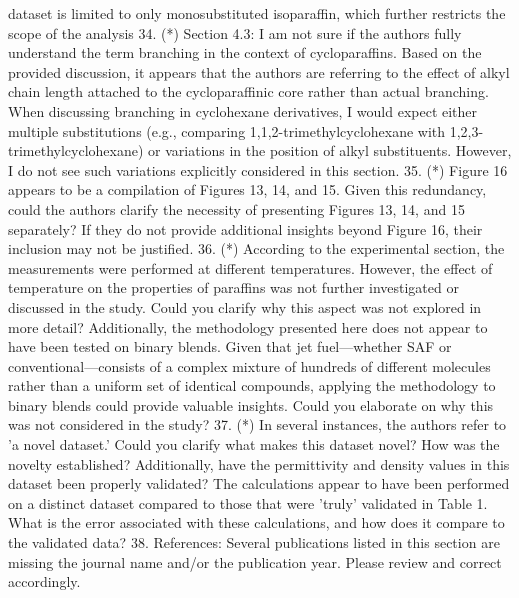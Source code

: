 \documentclass{article}
\begin{document}
dataset is limited to only monosubstituted isoparaffin, which further restricts the scope of the analysis
34.     (*) Section 4.3: I am not sure if the authors fully understand the term branching in the context of cycloparaffins. Based on the provided discussion, it appears that the authors are referring to the effect of alkyl chain length attached to the cycloparaffinic core rather than actual branching. When discussing branching in cyclohexane derivatives, I would expect either multiple substitutions (e.g., comparing 1,1,2-trimethylcyclohexane with 1,2,3-trimethylcyclohexane) or variations in the position of alkyl substituents. However, I do not see such variations explicitly considered in this section.
35.     (*) Figure 16 appears to be a compilation of Figures 13, 14, and 15. Given this redundancy, could the authors clarify the necessity of presenting Figures 13, 14, and 15 separately? If they do not provide additional insights beyond Figure 16, their inclusion may not be justified.
36.     (*) According to the experimental section, the measurements were performed at different temperatures. However, the effect of temperature on the properties of paraffins was not further investigated or discussed in the study. Could you clarify why this aspect was not explored in more detail? Additionally, the methodology presented here does not appear to have been tested on binary blends. Given that jet fuel—whether SAF or conventional—consists of a complex mixture of hundreds of different molecules rather than a uniform set of identical compounds, applying the methodology to binary blends could provide valuable insights. Could you elaborate on why this was not considered in the study?
37.     (*) In several instances, the authors refer to 'a novel dataset.' Could you clarify what makes this dataset novel? How was the novelty established? Additionally, have the permittivity and density values in this dataset been properly validated? The calculations appear to have been performed on a distinct dataset compared to those that were 'truly' validated in Table 1. What is the error associated with these calculations, and how does it compare to the validated data?
38.     References: Several publications listed in this section are missing the journal name and/or the publication year. Please review and correct accordingly.
\end{document}
